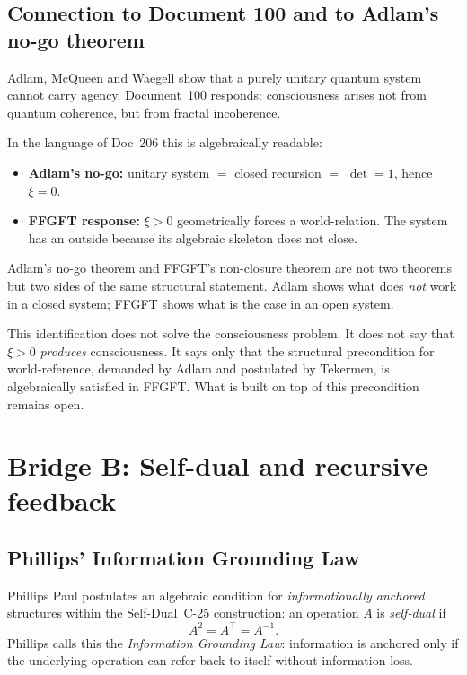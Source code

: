 \subsection{Connection to Document 100 and to Adlam's no-go theorem}

Adlam, McQueen and Waegell show that a purely unitary quantum system cannot carry agency. Document~100 responds: consciousness arises not from quantum coherence, but from fractal incoherence.

In the language of Doc~206 this is algebraically readable:

\begin{itemize}
\item \textbf{Adlam's no-go:} unitary system $=$ closed recursion $=$ $\det = 1$, hence $\xi = 0$.
\item \textbf{FFGFT response:} $\xi > 0$ geometrically forces a world-relation. The system has an outside because its algebraic skeleton does not close.
\end{itemize}

Adlam's no-go theorem and FFGFT's non-closure theorem are not two theorems but two sides of the same structural statement. Adlam shows what does \emph{not} work in a closed system; FFGFT shows what is the case in an open system.

\begin{interpretation}
This identification does not solve the consciousness problem. It does not say that $\xi > 0$ \emph{produces} consciousness. It says only that the structural precondition for world-reference, demanded by Adlam and postulated by Tekermen, is algebraically satisfied in FFGFT. What is built on top of this precondition remains open.
\end{interpretation}

\section{Bridge B: Self-dual and recursive feedback}\label{sec:bridgeB}

\subsection{Phillips' Information Grounding Law}

Phillips Paul postulates an algebraic condition for \emph{informationally anchored} structures within the Self-Dual~C-25 construction: an operation $A$ is \emph{self-dual} if
\begin{equation}
A^2 = A^\top = A^{-1}.
\end{equation}
Phillips calls this the \emph{Information Grounding Law}: information is anchored only if the underlying operation can refer back to itself without information loss.

